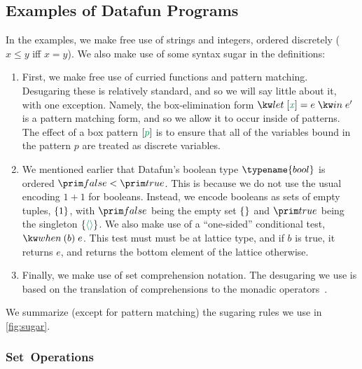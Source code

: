 

\subsection{Examples of Datafun Programs}



In the examples, we make free use of strings and integers, ordered discretely
($x \le y$ iff $x = y$). We also make use of some syntax sugar in the
definitions:

\begin{enumerate}
\item First, we make free use of curried functions and pattern
  matching. Desugaring these is relatively standard, and so we will
  say little about it, with one exception. Namely, the box-elimination
  form $\eletbox x e e'$ is a pattern matching form, and so we allow
  it to occur inside of patterns. The effect of a box pattern
  $\ebox{p}$ is to ensure that all of the variables bound in the
  pattern $p$ are treated as discrete variables.

\item We mentioned earlier that Datafun's boolean type $\typename{bool}$ is
  ordered $\efalse < \etrue$. This is because we do not use the usual encoding
  $1+1$ for booleans. Instead, we encode booleans as sets of empty tuples,
  $\{{1}\}$, with $\efalse$ being the empty set $\eset{}$ and $\etrue$ being the
  singleton $\eset{\etuple{}}$. We also make use of a ``one-sided'' conditional
  test, $\ewhen{b}{e}$. This test must must be at lattice type, and if $b$ is
  true, it returns $e$, and returns the bottom element of the lattice otherwise.
  
\item Finally, we make use of set comprehension notation. The
  desugaring we use is based on the translation of comprehensions to
  the monadic operators~\cite{wadler-monad-comprehensions}.
\end{enumerate}
We summarize (except for pattern matching) the sugaring rules we use in
\cref{fig:sugar}.

\subsubsection{Set\, Operations}

